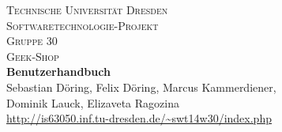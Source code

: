 \begin{titlepage}
\begin{center}
\textsc{\LARGE Technische Universit\"at Dresden} \\[0.5cm]
\textsc{\LARGE Softwaretechnologie-Projekt\\[0.2cm]Gruppe 30}\\[0.7cm]
\textsc{\LARGE Geek-Shop}\\[4cm]
{\fontsize{35}{35} \bfseries Benutzerhandbuch}\\
\vspace*{\fill}
Sebastian D\"oring, Felix D\"oring, Marcus Kammerdiener,\\ Dominik Lauck, Elizaveta Ragozina\\[0.5cm]
\url{http://is63050.inf.tu-dresden.de/~swt14w30/index.php}
\end{center}
\end{titlepage}
